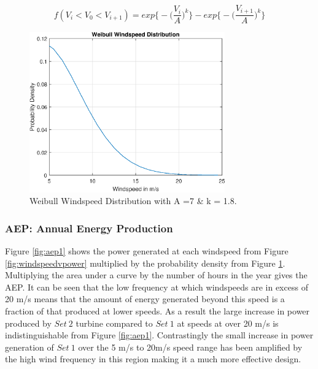 \documentclass[11pt]{article}
\begin{document}
\begin{equation}
	\label{eq:weibull}
	f(V_i < V_0 < V_{i+1} ) = exp \bigg \{ - \Big( \frac{V_i}{A}\Big )^k \bigg \}  - exp \bigg \{ - \Big( \frac{V_{i+1}}{A}\Big )^k \bigg \} 
\end{equation}
\FloatBarrier
\begin{figure}[h!]
\centering
	\includegraphics[width=0.75\textwidth]{Weibull}
	\caption{Weibull Windspeed Distribution with A =7 \& k = 1.8.}\label{fig:weibull}
\end{figure}

\FloatBarrier
\subsubsection{AEP: Annual Energy Production}

Figure \ref{fig:aep1} shows the power generated at each windspeed from Figure \ref{fig:windspeedvpower} multiplied by the probability density from Figure \ref{fig:weibull}. Multiplying the area under a curve by the number of hours in the year gives the AEP. It can be seen that the low frequency at which windspeeds are in excess of 20 m/s means that the amount of energy generated beyond this speed is a fraction of that produced at lower speeds. As a result the large increase in power produced by $Set \ 2 $ turbine compared to $Set \ 1$ at speeds at over 20 m/s is indistinguishable from Figure \ref{fig:aep1}. Contrastingly the  small increase in power generation of $Set \ 1$ over the 5 m/s to 20m/s speed range has been amplified by the high wind frequency in this region making it a much more effective design.
\end{document}
